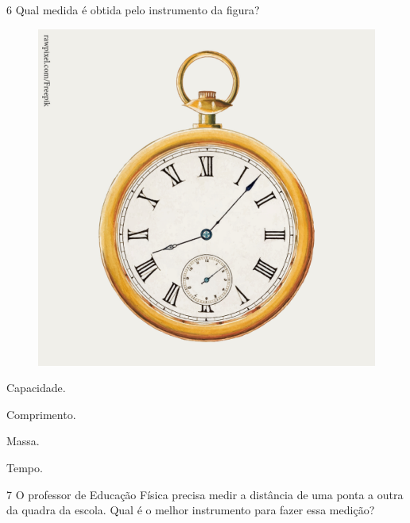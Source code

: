 \num{6} Qual medida é obtida pelo instrumento da figura?

\begin{minipage}{.5\textwidth}
\begin{figure}[H]
\centering
\includegraphics[width=.6\textwidth]{./media/image129.png}
\end{figure}
\end{minipage}
\hspace{0.5cm}
\begin{minipage}{.5\textwidth}

\begin{escolha}[itemsep=-5pt]
\item Capacidade.

\item Comprimento.

\item Massa.

\item Tempo.
\end{escolha}
\end{minipage}

\num{7} O professor de Educação Física precisa medir a distância de uma ponta a
outra da quadra da escola. Qual é o melhor instrumento para fazer essa
medição?\enlargethispage{4\baselineskip}


